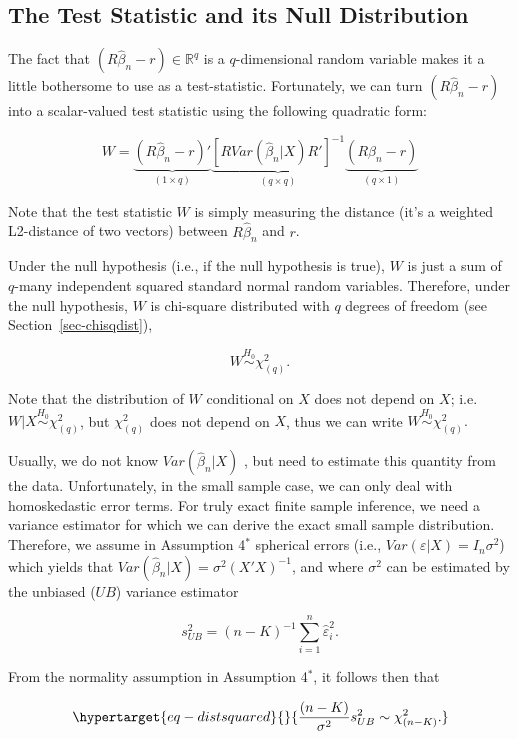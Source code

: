 \documentclass[
  letterpaper,
  DIV=11,
  numbers=noendperiod]{scrreprt}
\theoremstyle{definition}
\theoremstyle{plain}
\theoremstyle{plain}
\theoremstyle{remark}
\begin{document}
\hypertarget{the-test-statistic-and-its-null-distribution}{%
\subsection{The Test Statistic and its Null
Distribution}\label{the-test-statistic-and-its-null-distribution}}

The fact that \((R\hat\beta_n-r)\in\mathbb{R}^q\) is a \(q\)-dimensional
random variable makes it a little bothersome to use as a test-statistic.
Fortunately, we can turn \((R\hat\beta_n-r)\) into a scalar-valued test
statistic using the following quadratic form:

\[
W=\underbrace{(R\hat\beta_n -r)'}_{(1\times q)}\underbrace{[RVar(\hat\beta_n|X)R']^{-1}}_{(q\times q)}\underbrace{(R\hat\beta_n -r)}_{(q\times 1)}
\]

Note that the test statistic \(W\) is simply measuring the distance
(it's a weighted L2-distance of two vectors) between \(R\hat\beta_n\)
and \(r\).

Under the null hypothesis (i.e., if the null hypothesis is true), \(W\)
is just a sum of \(q\)-many independent squared standard normal random
variables. Therefore, under the null hypothesis, \(W\) is chi-square
distributed with \(q\) degrees of freedom (see
Section~\ref{sec-chisqdist}),

\[
W\overset{H_0}{\sim} \chi^2_{(q)}.
\]

Note that the distribution of \(W\) conditional on \(X\) does not depend
on \(X\); i.e.~\(W|X\overset{H_0}{\sim}\chi^2_{(q)}\), but
\(\chi^2_{(q)}\) does not depend on \(X\), thus we can write
\(W\overset{H_0}{\sim} \chi^2_{(q)}.\)

Usually, we do not know \(Var(\hat\beta_n|X)\) , but need to estimate
this quantity from the data. Unfortunately, in the small sample case, we
can only deal with homoskedastic error terms. For truly exact finite
sample inference, we need a variance estimator for which we can derive
the exact small sample distribution. Therefore, we assume in Assumption
4\(^*\) spherical errors (i.e., \(Var(\varepsilon|X)=I_n\sigma^2\))
which yields that \(Var(\hat\beta_n|X)=\sigma^2(X'X)^{-1}\), and where
\(\sigma^2\) can be estimated by the unbiased (\(UB\)) variance
estimator

\[
s_{UB}^2=(n-K)^{-1}\sum_{i=1}^n\hat\varepsilon_i^2.
\]

From the normality assumption in Assumption 4\(^*\), it follows then
that

\begin{equation}\protect\hypertarget{eq-distsquared}{}{
\frac{(n-K)}{\sigma^{2}}s_{UB}^2\sim\chi^2_{(n-K)}.
}\label{eq-distsquared}\end{equation}
\end{document}
